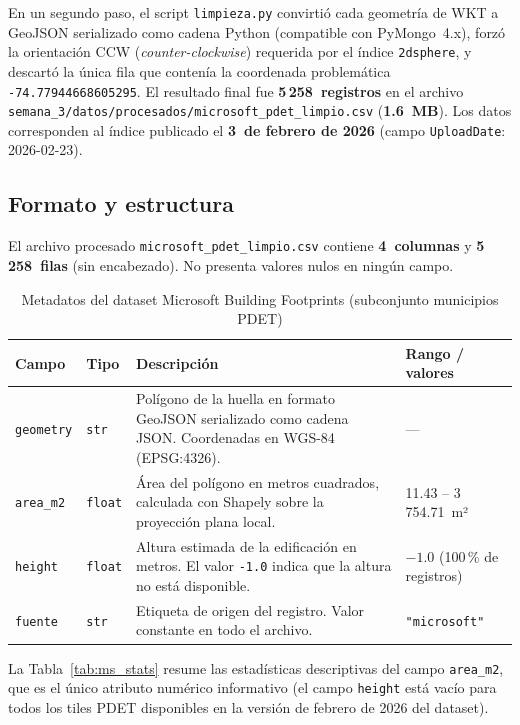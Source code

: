 \documentclass[12pt, a4paper]{report}
\begin{document}
En un segundo paso, el script \texttt{limpieza.py} convirtió cada
geometría de WKT a GeoJSON serializado como cadena Python
(compatible con PyMongo~4.x), forzó la orientación CCW
(\textit{counter-clockwise}) requerida por el índice
\texttt{2dsphere}, y descartó la única fila que contenía la coordenada
problemática \texttt{-74.77944668605295}.
El resultado final fue \textbf{5\,258~registros} en el archivo
\texttt{semana\_3/datos/procesados/microsoft\_pdet\_limpio.csv}
(\textbf{1.6~MB}).
Los datos corresponden al índice publicado el \textbf{3~de febrero de 2026}
(campo \texttt{UploadDate}: 2026-02-23).

\subsection{Formato y estructura}
\label{subsec:ms_formato}

El archivo procesado \texttt{microsoft\_pdet\_limpio.csv} contiene
\textbf{4~columnas} y \textbf{5\,258~filas} (sin encabezado).
No presenta valores nulos en ningún campo.

\begin{table}[H]
  \centering
  \caption{Metadatos del dataset Microsoft Building Footprints
           (subconjunto municipios PDET)}
  \label{tab:ms_metadatos}
  \begin{tabularx}{\textwidth}{llXl}
    \toprule
    \textbf{Campo} & \textbf{Tipo} & \textbf{Descripción} & \textbf{Rango / valores} \\
    \midrule
    \texttt{geometry}  & \texttt{str}   &
      Polígono de la huella en formato GeoJSON serializado como cadena JSON.
      Coordenadas en WGS-84 (EPSG:4326). &
      — \\
    \texttt{area\_m2}  & \texttt{float} &
      Área del polígono en metros cuadrados, calculada con Shapely
      sobre la proyección plana local. &
      11.43 – 3\,754.71~m² \\
    \texttt{height}    & \texttt{float} &
      Altura estimada de la edificación en metros.
      El valor \texttt{-1.0} indica que la altura no está disponible. &
      $-1.0$ (100\,\% de registros) \\
    \texttt{fuente}    & \texttt{str}   &
      Etiqueta de origen del registro. Valor constante en todo el archivo. &
      \texttt{"microsoft"} \\
    \bottomrule
  \end{tabularx}
\end{table}

\noindent
La Tabla~\ref{tab:ms_stats} resume las estadísticas descriptivas del
campo \texttt{area\_m2}, que es el único atributo numérico informativo
(el campo \texttt{height} está vacío para todos los tiles PDET disponibles
en la versión de febrero de 2026 del dataset).
\end{document}
